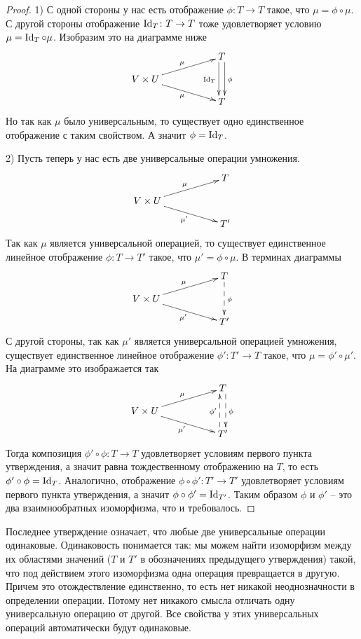 \begin{proof}
1) С одной стороны у нас есть отображение $\phi\colon T\to T$ такое, что $\mu = \phi \circ \mu$.
С другой стороны отображение $\operatorname{Id}_T\colon T\to T$ тоже удовлетворяет условию $\mu = \operatorname{Id}_T \circ \mu$.
Изобразим это на диаграмме ниже
\[
\xymatrix@R=10pt{
	{}&{}&{T}\ar@<3pt>[dd]^{\phi}\ar@<-3pt>[dd]_{\Identity_T}\\
	{V\times U}\ar[urr]^{\mu}\ar[drr]_{\mu}&{}&{}\\
	{}&{}&{T}\\
}
\]
Но так как $\mu$ было универсальным, то существует одно единственное отображение с таким свойством.
А значит $\phi = \operatorname{Id}_T$.

2) Пусть теперь у нас есть две универсальные операции умножения.
\[
\xymatrix@R=10pt{
	{}&{}&{T}\\
	{V\times U}\ar[urr]^{\mu}\ar[drr]_{\mu'}&{}&{}\\
	{}&{}&{T'}\\
}
\]
Так как $\mu$ является универсальной операцией, то существует единственное линейное отображение $\phi\colon T\to T'$ такое, что $\mu' = \phi \circ \mu$.
В терминах диаграммы
\[
\xymatrix@R=10pt{
	{}&{}&{T}\ar@{-->}[dd]^{\phi}\\
	{V\times U}\ar[urr]^{\mu}\ar[drr]_{\mu'}&{}&{}\\
	{}&{}&{T'}\\
}
\]
С другой стороны, так как $\mu'$ является универсальной операцией умножения, существует единственное линейное отображение $\phi'\colon T'\to T$ такое, что $\mu = \phi' \circ \mu'$.
На диаграмме это изображается так
\[
\xymatrix@R=10pt{
	{}&{}&{T}\ar@{-->}@<3pt>[dd]^{\phi}\\
	{V\times U}\ar[urr]^{\mu}\ar[drr]_{\mu'}&{}&{}\\
	{}&{}&{T'}\ar@{-->}@<3pt>[uu]^{\phi'}\\
}
\]
Тогда композиция $\phi'\circ \phi \colon T\to T$ удовлетворяет условиям первого пункта утверждения, а значит равна тождественному отображению на $T$, то есть $\phi'\circ \phi = \operatorname{Id}_T$.
Аналогично, отображение $\phi\circ \phi'\colon T'\to T'$ удовлетворяет условиям первого пункта утверждения, а значит $\phi\circ \phi' = \operatorname{Id}_{T'}$.
Таким образом $\phi$ и $\phi'$ -- это два взаимнообратных изоморфизма, что и требовалось.
\end{proof}

Последнее утверждение означает, что любые две универсальные операции одинаковые.
Одинаковость понимается так: мы можем найти изоморфизм между их областями значений ($T$ и $T'$ в обозначениях предыдущего утверждения) такой, что под действием этого изоморфизма одна операция превращается в другую.
Причем это отождествление единственно, то есть нет никакой неоднозначности в определении операции.
Потому нет никакого смысла отличать одну универсальную операцию от другой.
Все свойства у этих универсальных операций автоматически будут одинаковые.


